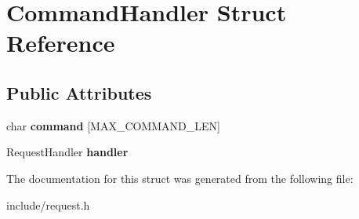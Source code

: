 \hypertarget{struct_command_handler}{}\section{Command\+Handler Struct Reference}
\label{struct_command_handler}
\subsection*{Public Attributes}
\begin{DoxyCompactItemize}
\item 
\mbox{\label{struct_command_handler_aae2a4fb2c875bbf2f160d5f2baed8b5e}} 
char {\bfseries command} \mbox{[}M\+A\+X\+\_\+\+C\+O\+M\+M\+A\+N\+D\+\_\+\+L\+EN\mbox{]}
\item 
\mbox{\label{struct_command_handler_a8c8bd285803a8102baf06c76c310e107}} 
Request\+Handler {\bfseries handler}
\end{DoxyCompactItemize}


The documentation for this struct was generated from the following file\+:\begin{DoxyCompactItemize}
\item 
include/request.\+h\end{DoxyCompactItemize}
